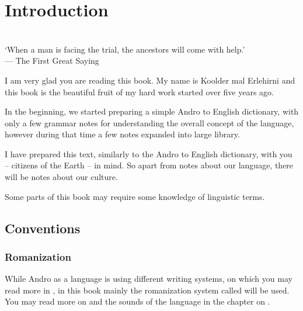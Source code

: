 \chapter{Introduction}
\label{ch:introduction}

\begin{center}\small
  \\
  `When a man is facing the trial, the ancestors will come with help.'\\
  --- The First Great Saying\footnotemark
\end{center}\bigskip


 I am very glad you are reading this book. My name is
Koolder mal Erlehirni and this book is the beautiful fruit of my hard work
started over five years ago.

In the beginning, we started preparing a simple Andro to English dictionary,
with only a few grammar notes for understanding the overall concept of the
language, however during that time a few notes expanded into large library.

I have prepared this text, similarly to the Andro to English dictionary, with
you -- citizens of the Earth -- in mind. So apart from notes about our language,
there will be notes about our culture.

Some parts of this book may require some knowledge of linguistic terms.

\bigskip


\section{Conventions}

\subsection{Romanization}

While Andro as a language is using different writing systems, on which you may
read more in , in this book mainly the romanization system
called  will be used. You may read more on  and the
sounds of the language in the chapter on .

